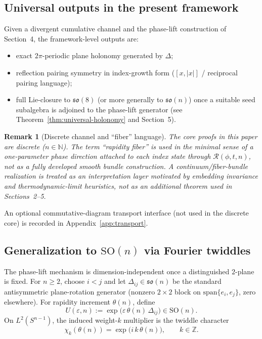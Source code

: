 \documentclass[11pt]{amsart}
\newtheorem{remark}[theorem]{Remark}
\begin{document}
\subsection*{Universal outputs in the present framework}
Given a divergent cumulative channel and the phase-lift construction of Section~4, the framework-level outputs are:
\begin{itemize}
  \item exact \(2\pi\)-periodic plane holonomy generated by \(\Delta\);
  \item reflection pairing symmetry in index-growth form (\([x,|x|]\) / reciprocal pairing language);
  \item full Lie-closure to \(\mathfrak{so}(8)\) (or more generally to \(\mathfrak{so}(n)\)) once a suitable seed subalgebra is adjoined to the phase-lift generator (see Theorem~\ref{thm:universal-holonomy} and Section~5).
\end{itemize}

\begin{remark}[Discrete channel and ``fiber'' language]
The core proofs in this paper are discrete (\(n\in\mathbb N\)). The term ``rapidity fiber'' is used in the minimal sense of a one-parameter phase direction attached to each index state through \(\mathcal R(\phi,t,n)\), not as a fully developed smooth bundle construction. A continuum/fiber-bundle realization is treated as an interpretation layer motivated by embedding invariance and thermodynamic-limit heuristics, not as an additional theorem used in Sections~2--5.
\end{remark}

An optional commutative-diagram transport interface (not used in the discrete core) is recorded in Appendix~\ref{app:transport}.

\subsection*{Generalization to \texorpdfstring{$\mathrm{SO}(n)$}{SO(n)} via Fourier twiddles}
The phase-lift mechanism is dimension-independent once a distinguished \(2\)-plane is fixed. For \(n\ge 2\), choose \(i<j\) and let \(\Delta_{ij}\in\mathfrak{so}(n)\) be the standard antisymmetric plane-rotation generator (nonzero \(2\times2\) block on \(\mathrm{span}\{e_i,e_j\}\), zero elsewhere). For rapidity increment \(\theta(n)\), define
\[
U(\varepsilon,n):=\exp\!\bigl(\varepsilon\,\theta(n)\,\Delta_{ij}\bigr)\in \mathrm{SO}(n).
\]
On \(L^2(S^{n-1})\), the induced weight-\(k\) multiplier is the twiddle character
\[
\chi_k(\theta(n))=\exp\!\bigl(i\,k\,\theta(n)\bigr),\qquad k\in\mathbb Z.
\]
\end{document}
